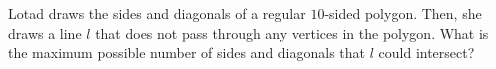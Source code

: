 Lotad draws the sides and diagonals of a regular $10$-sided polygon. Then, she draws a line $l$ that does not pass through any vertices in the polygon. What is the maximum possible number of sides and diagonals that $l$ could intersect?
